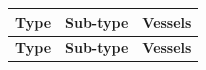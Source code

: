 \begin{longtable}{l|l|l}

\hline \multicolumn{1}{|c|}{\textbf{Type}} & \multicolumn{1}{c|}{\textbf{Sub-type}} & \multicolumn{1}{c|}{\textbf{Vessels}} \\ \hline 
\endfirsthead
\hline \multicolumn{1}{|c|}{\textbf{Type}} &
\multicolumn{1}{c|}{\textbf{Sub-type}} &
\multicolumn{1}{c|}{\textbf{Vessels}} \\ \hline 
\endhead


\end{longtable}
